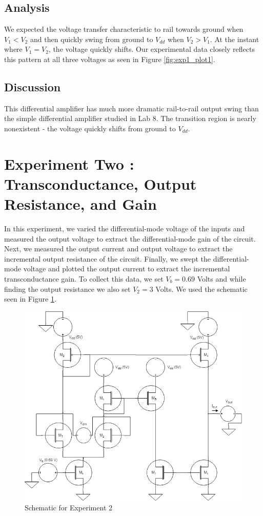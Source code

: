 \documentclass{article}
\begin{document}
\subsection{Analysis}
We expected the voltage transfer characteristic to rail towards ground when $V_1 < V_2$ and then quickly swing from ground to $V_{dd}$ when $V_2 > V_1$. At the instant where $V_1 = V_2$, the voltage quickly shifts. Our experimental data closely reflects this pattern at all three voltages as seen in Figure \ref{fig:exp1_plot1}.

\subsection{Discussion}
This differential amplifier has much more dramatic rail-to-rail output swing than the simple differential amplifier studied in Lab 8. The transition region is nearly nonexistent - the voltage quickly shifts from ground to $V_{dd}$.

\section{Experiment Two : Transconductance, Output Resistance, and Gain}

In this experiment, we varied the differential-mode voltage of the inputs and measured the output voltage to extract the differential-mode gain of the circuit.  Next, we measured the output current and output voltage to extract the incremental output resistance of the circuit.  Finally, we swept the differential-mode voltage and plotted the output current to extract the incremental transconductance gain.  To collect this data, we set $V_{b} = 0.69$ Volts and while finding the output resistance we also set $V_{2} = 3$ Volts. We used the schematic seen in Figure \ref{fig:exp2_schematic}.
\begin{figure}[H]
  \begin{center}      
  \includegraphics[scale = 0.5]{images/exp2_schematic.jpg}
  \caption{Schematic for Experiment 2}   
  \label{fig:exp2_schematic}
  \end{center}
\end{figure}
\end{document}
